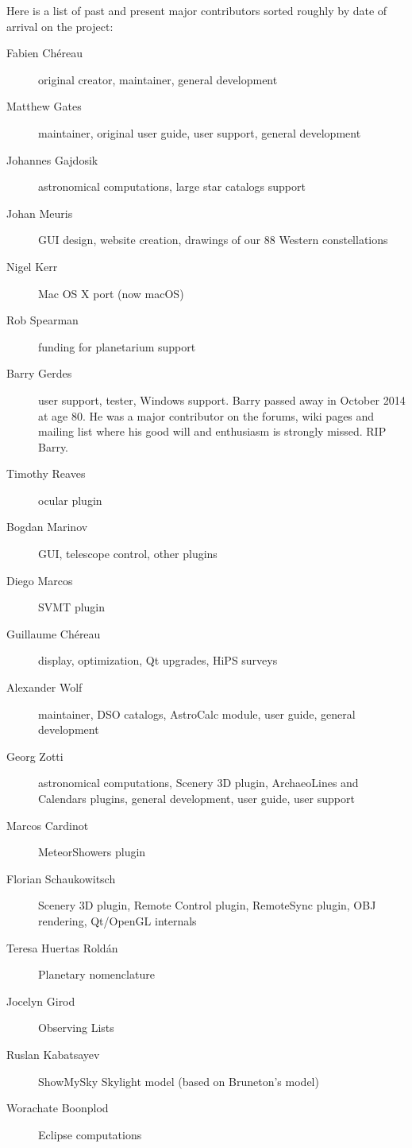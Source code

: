Here is a list of past and present major contributors sorted roughly by date of
arrival on the project:
\newpage
\begin{description}
\item[Fabien Ch\'ereau] original creator, maintainer, general development
\item[Matthew Gates] maintainer, original user guide, user support, general development
\item[Johannes Gajdosik] astronomical computations, large star catalogs support
\item[Johan Meuris] GUI design, website creation, drawings of our 88 Western constellations
\item[Nigel Kerr] Mac OS X port (now macOS)
\item[Rob Spearman] funding for planetarium support
\item[Barry Gerdes] user support, tester, Windows support. Barry
  passed away in October 2014 at age 80. He was a major contributor on
  the forums, wiki pages and mailing list where his good will and
  enthusiasm is strongly missed.  RIP Barry.
\item[Timothy Reaves] ocular plugin
\item[Bogdan Marinov] GUI, telescope control, other plugins
\item[Diego Marcos] SVMT plugin
\item[Guillaume Ch\'ereau] display, optimization, Qt upgrades, HiPS surveys
\item[Alexander Wolf] maintainer, DSO catalogs, AstroCalc module, user guide, general development
\item[Georg Zotti] astronomical computations, Scenery 3D plugin, ArchaeoLines and Calendars plugins, general development, user guide, user support
\item[Marcos Cardinot] MeteorShowers plugin
\item[Florian Schaukowitsch] Scenery 3D plugin, Remote Control plugin, RemoteSync plugin, OBJ rendering, Qt/OpenGL internals
\item[Teresa Huertas Rold\'an] Planetary nomenclature
\item[Jocelyn Girod] Observing Lists
\item[Ruslan Kabatsayev] ShowMySky Skylight model (based on Bruneton's model) 
\item[Worachate Boonplod] Eclipse computations
\end{description}

